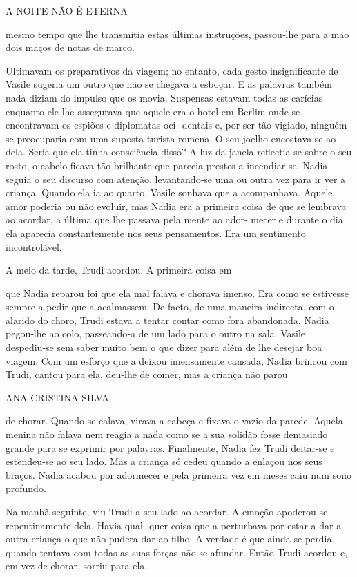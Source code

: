 A NOITE NÃO É ETERNA

mesmo tempo que lhe transmitia estas últimas instruções, passou‑lhe para
a mão dois maços de notas de marco.

Ultimavam os preparativos da viagem; no entanto, cada gesto
insignificante de Vasile sugeria um outro que não se chegava a esboçar.
E as palavras também nada diziam do impulso que os movia. Suspensas
estavam todas as carícias enquanto ele lhe assegurava que aquele era o
hotel em Berlim onde se encontravam os espiões e diplomatas oci‑ dentais
e, por ser tão vigiado, ninguém se preocuparia com uma suposta turista
romena. O seu joelho encostava‑se ao dela. Seria que ela tinha
consciência disso? A luz da janela reflectia‑se sobre o seu rosto, o
cabelo ficava tão brilhante que parecia prestes a incendiar‑se. Nadia
seguia o seu discurso com atenção, levantando‑se uma ou outra vez para
ir ver a criança. Quando ela ia ao quarto, Vasile sonhava que a
acompanhava. Aquele amor poderia ou não evoluir, mas Nadia era a
primeira coisa de que se lembrava ao acordar, a última que lhe passava
pela mente ao ador‑ mecer e durante o dia ela aparecia constantemente
nos seus pensamentos. Era um sentimento incontrolável.

A meio da tarde, Trudi acordou. A primeira coisa em

que Nadia reparou foi que ela mal falava e chorava imenso. Era como se
estivesse sempre a pedir que a acalmassem. De facto, de uma maneira
indirecta, com o alarido do choro, Trudi estava a tentar contar como
fora abandonada. Nadia pegou‑lhe ao colo, passeando‑a de um lado para o
outro na sala. Vasile despediu‑se sem saber muito bem o que dizer para
além de lhe desejar boa viagem. Com um esforço que a deixou imensamente
cansada, Nadia brincou com Trudi, cantou para ela, deu‑lhe de comer, mas
a criança não parou

ANA CRISTINA SILVA

de chorar. Quando se calava, virava a cabeça e fixava o vazio da parede.
Aquela menina não falava nem reagia a nada como se a sua solidão fosse
demasiado grande para se exprimir por palavras. Finalmente, Nadia fez
Trudi deitar‑se e estendeu‑se ao seu lado. Mas a criança só cedeu quando
a enlaçou nos seus braços. Nadia acabou por adormecer e pela primeira
vez em meses caiu num sono profundo.

Na manhã seguinte, viu Trudi a seu lado ao acordar. A emoção apoderou‑se
repentinamente dela. Havia qual‑ quer coisa que a perturbava por estar a
dar a outra criança o que não pudera dar ao filho. A verdade é que ainda
se perdia quando tentava com todas as suas forças não se afundar. Então
Trudi acordou e, em vez de chorar, sorriu para ela.

